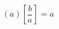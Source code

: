 \documentclass{article}
\begin{document}
\[\left(a\right)\left[\frac{b}{a}\right]=a\,\]
\end{document}
